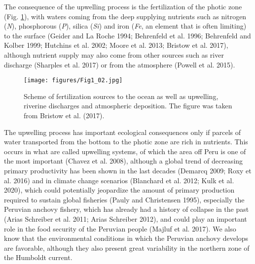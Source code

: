 The consequence of the upwelling process is the fertilization of the photic zone (Fig. \ref{fig:Fig1_02}), with waters coming from the deep supplying nutrients such as nitrogen (\textit{N}), phosphorous (\textit{P}), silica (\textit{Si}) and iron (\textit{Fe}, an element that is often limiting) to the surface \citep{GeidLaro1994,Behr1996,BehrKolb1999,Hutc2002,MoorMils2013,BrisMohr2017}(Geider and La Roche 1994; Behrenfeld et al. 1996; Behrenfeld and Kolber 1999; Hutchins et al. 2002; Moore et al. 2013; Bristow et al. 2017), although nutrient supply may also come from other sources such as river discharge \citep{Shar2017}(Sharples et al. 2017) or from the atmosphere \citep{Powe2015}(Powell et al. 2015).\\

\begin{figure}[ht]
	\texttt{[image: figures/Fig1\_02.jpg]}
	\centering
	\caption{Scheme of fertilization sources to the ocean as well as upwelling, riverine discharges and atmospheric deposition. The figure was taken from Bristow et al. (2017).}
	\centering
	\label{fig:Fig1_02}
\end{figure}

The upwelling process has important ecological consequences only if parcels of water transported from the bottom to the photic zone are rich in nutrients. This occurs in what are called upwelling systems, of which the area off Peru is one of the most important \citep{ChavBert2008}(Chavez et al. 2008), although  a global trend of decreasing primary productivity has been shown in the last decades \citep{Dema2009,Roxy2016}(Demarcq 2009; Roxy et al. 2016) and in climate change scenarios \citep{Blanc2012,Kulk2020}(Blanchard et al. 2012; Kulk et al. 2020), which could potentially jeopardize the amount of primary production required to sustain global fisheries \citep{PaulChri1995}(Pauly and Christensen 1995), especially the Peruvian anchovy fishery, which has already had a history of collapse in the past \citep{AriaNiqu2011,Aria2012}(Arias Schreiber et al. 2011; Arias Schreiber 2012), and could play an important role in the food security of the Peruvian people \citep{MajlDela2017}(Majluf et al. 2017). We also know that the environmental conditions in which the Peruvian anchovy develops are favorable, although they also present great variability in the northern zone of the Humboldt current.\\

